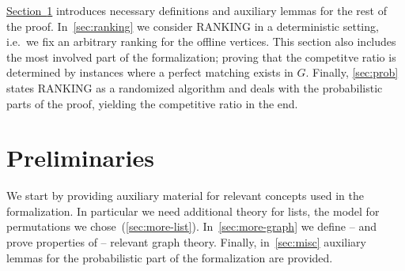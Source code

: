 \documentclass[11pt,a4paper]{article}
\begin{document}
\hyperref[sec:prelims]{Section~\ref*{sec:prelims}} introduces necessary definitions and auxiliary lemmas for the rest of the
proof. In~\autoref{sec:ranking} we consider RANKING in a deterministic setting, i.e.\ we fix
an arbitrary ranking for the offline vertices. This section also includes the most involved part
of the formalization; proving that the competitve ratio is determined by instances where a perfect
matching exists in $G$. Finally, \autoref{sec:prob} states RANKING as a randomized algorithm and
deals with the probabilistic parts of the proof, yielding the competitive ratio in the end.

\section{Preliminaries}\label{sec:prelims}
We start by providing auxiliary material for relevant concepts used in the formalization.
In particular we need additional theory for lists, the model for permutations we 
chose~(\autoref{sec:more-list}).
In~\autoref{sec:more-graph} we define -- and prove properties of -- relevant graph theory.
Finally, in~\autoref{sec:misc} auxiliary lemmas for the probabilistic part of the formalization
are provided.





\end{document}
